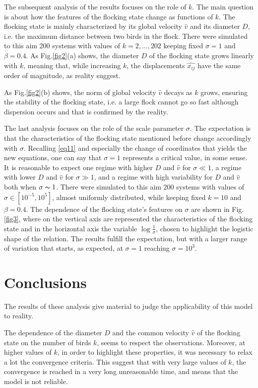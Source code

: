 \documentclass{article} %
\newcounter{late}
\begin{document}
The subsequent analysis of the results focuses on the role of $k$. The main question is about how 
the features of the flocking state change as functions of $k$. The flocking state is mainly
characterized by its global velocity $\widehat{v}$ and its diameter $D$, i.e. the maximum distance 
between two birds in the flock. There were simulated to this aim 200 systems with values of $k=2,...,202$ 
keeping fixed $\sigma=1$ and $\beta=0.4$.
As Fig.\ref{fig2}(a) shows, the diameter $D$ of the flocking state grows linearly with 
$k$, meaning that, 
while increasing $k$,
the displacements $\widehat{x_{ij}}$ have the same order of magnitude, as reality suggest.

As Fig.\ref{fig2}(b) shows, the norm of global velocity $\widehat{v}$ decays as $k$ grows, ensuring the stability 
of the flocking state, i.e. a large flock cannot go so fast although dispersion occurs and that is confirmed 
by the reality.

The last analysis focuses on the role of the scale parameter $\sigma$. The expectation is that 
the characteristics of the flocking state mentioned before change accordingly with $\sigma$. 
Recalling \eqref{eq11} and especially the change of coordinates that yields the new equations,
one can say that $\sigma=1$ represents a critical value, in some sense.
It is reasonable to expect one regime with higher $D$ and $\widehat{v}$ for $\sigma\ll1$, a regime 
with lower $D$ and $\widehat{v}$ for $\sigma\gg1$, and a regime with high variability for 
$D$ and $\widehat{v}$ both when $\sigma\thicksim 1$.
There were simulated to this aim 200 systems with values of $\sigma\in[10^{-5},10^5]$, almost 
uniformly distributed, while keeping fixed $k=10$ and $\beta=0.4$.
The dependence of the flocking state's features on $\sigma$ are shown in Fig.\ref{fig3},
where on the vertical axis are represented
the characteristics of the flocking state and in the horizontal axis the variable $\log\frac{1}{\sigma}$,
chosen to highlight the logistic shape of the relation. The results fulfill the expectation, but with a
larger range of variation that starts, as expected, at $\sigma=1$ reaching $\sigma=10^3$.

\section {Conclusions}
The results of these analysis give material to judge the applicability of this model to reality.

The dependence of the diameter $D$ and the common velocity $\widehat{v}$ of the flocking state 
on the number of birds $k$, seems to respect the observations. Moreover, at higher values of $k$,
in order to highlight these properties, it was necessary to relax a lot the convergence criteria. This suggest
that with very large values of $k$, the convergence is reached in a very long unreasonable time, 
and means that the model is not reliable.
\end{document}

